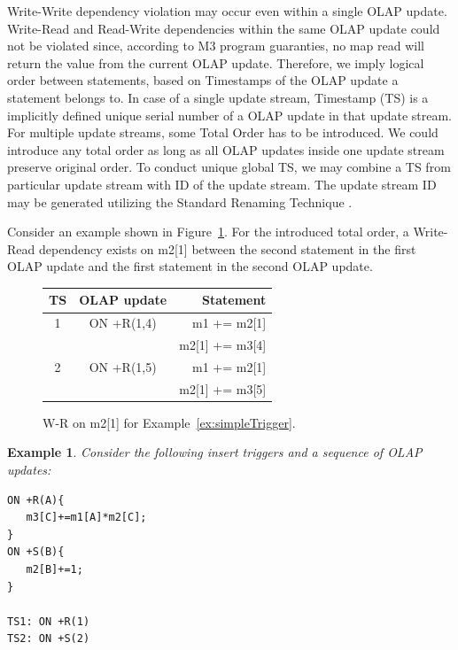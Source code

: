 \documentclass{sig-semester}
\newtheorem{example}[theorem]{Example}
\def\OLAP{OLAP\xspace}
\def\M3{M3\xspace}
\begin{document}
Write-Write dependency violation may occur even within a single \OLAP update. Write-Read and Read-Write dependencies within the same \OLAP update could not be violated since, according to \M3 program guaranties, no map read will return the value from the current \OLAP update. Therefore, we imply logical order between statements, based on Timestamps of the \OLAP update a statement belongs to. In case of a single update stream, Timestamp (TS) is a implicitly defined unique serial number of a \OLAP update in that update stream. For multiple update streams, some Total Order has to be introduced. We could introduce any total order as long as all \OLAP updates inside one update stream preserve original order. To conduct unique global TS, we may combine a TS from particular update stream with ID of the update stream. The update stream ID may be generated utilizing the Standard Renaming Technique \cite{Welch04}.

Consider an example shown in Figure~\ref{fig:streamWR}. For the introduced total order, a Write-Read dependency exists on m2[1] between the second statement in the first \OLAP update and the first statement in the second \OLAP update.

\begin{figure}
\begin{center}

\begin{tabular}{c|c|r}
TS & \OLAP update & Statement\\
\hline
1 & ON +R(1,4) & m1 += m2[1]    \\
  &            & m2[1] += m3[4] \\
\hline
2 & ON +R(1,5) & m1 += m2[1]    \\
  &            & m2[1] += m3[5] \\
\end{tabular}
\end{center}

\vspace{-3mm}
\caption{W-R on m2[1] for Example~\ref{ex:simpleTrigger}.}
\label{fig:streamWR}
\vspace{-2mm}
\end{figure}



\begin{example} \em
\label{ex:foreachTrigger}
Consider the following insert triggers and a sequence of \OLAP updates:
\begin{verbatim}
ON +R(A){
   m3[C]+=m1[A]*m2[C];
}
ON +S(B){
   m2[B]+=1;
}

TS1: ON +R(1)
TS2: ON +S(2)
\end{verbatim}
\end{example}
\end{document}
